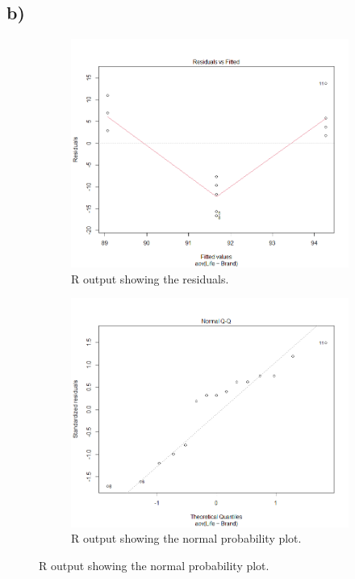 \documentclass{article}
\begin{document}
\subsection*{b)}
\begin{figure}[h]
    \centering
    \begin{subfigure}[b]{0.4\textwidth}
        \includegraphics[width=1.25\textwidth]{./images/7_b_1.png}
        \caption{R output showing the residuals.}
      \label{fig:img1}
    \end{subfigure}
    \hfill
    \begin{subfigure}[b]{0.4\textwidth}
        \includegraphics[width=1.25\textwidth]{./images/7_b_2.png}
        \caption{R output showing the normal probability plot.}
      \label{fig:img2}
    \end{subfigure}
    \label{fig:both}
\end{figure}
\end{document}
